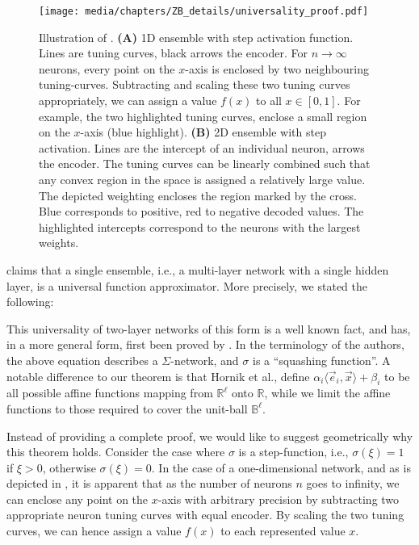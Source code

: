 \begin{figure}
	\centering
	\texttt{[image: media/chapters/ZB\_details/universality\_proof.pdf]}%
	{\label{fig:universality_proof_a}}%
	{\label{fig:universality_proof_b}}%
	\caption[Illustration of ]{Illustration of . \textbf{(A)} 1D ensemble with step activation function. Lines are tuning curves, black arrows the encoder. For $n \to \infty$ neurons, every point on the $x$-axis is enclosed by two neighbouring tuning-curves. Subtracting and scaling these two tuning curves appropriately, we can assign a value $f(x)$ to all $x \in [0, 1]$.
	For example, the two highlighted tuning curves, enclose a small region on the $x$-axis (blue highlight).
	\textbf{(B)} 2D ensemble with step activation. Lines are the intercept of an individual neuron, arrows the encoder.
	The tuning curves can be linearly combined such that any convex region in the space is assigned a relatively large value.
	The depicted weighting encloses the region marked by the cross. Blue corresponds to positive, red to negative decoded values. The highlighted intercepts correspond to the neurons with the largest weights.}
\end{figure}

 claims that a single \NEF ensemble, i.e., a multi-layer network with a single hidden layer, is a universal function approximator.
More precisely, we stated the following:

\ThmTwoLayerUniversal*

This universality of two-layer networks of this form is a well known fact, and has, in a more general form, first been proved by \citet{hornik1989multilayer}.
In the terminology of the authors, the above equation describes a $\Sigma$-network, and $\sigma$ is a \enquote{squashing function}.
A notable difference to our theorem is that Hornik et al., define $\alpha_i \langle \vec e_i, \vec x \rangle + \beta_i$ to be all possible affine functions mapping from $\mathbb{R}^\ell$ onto $\mathbb{R}$, while we limit the affine functions to those required to cover the unit-ball $\mathbb{B}^\ell$.

Instead of providing a complete proof, we would like to suggest geometrically why this theorem holds.
Consider the case where $\sigma$ is a step-function, i.e., $\sigma(\xi) = 1$ if $\xi > 0$, otherwise $\sigma(\xi) = 0$.
In the case of a one-dimensional network, and as is depicted in , it is apparent that as the number of neurons $n$ goes to infinity, we can enclose any point on the $x$-axis with arbitrary precision by subtracting two appropriate neuron tuning curves with equal encoder.
By scaling the two tuning curves, we can hence assign a value $f(x)$ to each represented value $x$.

